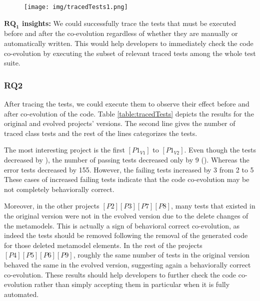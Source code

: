 \begin{figure}[t]
\centering
\texttt{[image: img/tracedTests1.png]}
\caption{}
\label{fig:tracedTests}
\end{figure}

\begin{tcolorbox}[boxsep=-2pt]
\textbf{$\boldsymbol{RQ_1}$ insights:}
We could successfully trace the tests that must be executed before and after the co-evolution regardless of whether they are manually or automatically written. This would help developers to immediately check the code co-evolution by executing the subset of relevant traced tests among the whole test suite. 
\end{tcolorbox}

\subsubsection{RQ2}

After tracing the tests, we could execute them to observe their effect before and after co-evolution of the code. Table \ref{table:tracedTests} depicts the results for the original and evolved projects' versions. The second line gives the number of traced class tests and the rest of the lines categorizes the tests.  

The most interesting project is the first $[P1_{V1}]$ to $[P1_{V2}]$. Even though the tests decreased by ), the number of passing tests decreased only by 9 (). Whereas the error tests decreased by 155. However, the failing tests increased by 3 from 2 to 5 These cases of increased failing tests indicate that the code co-evolution may be not completely behaviorally correct. 

Moreover, in the other projects $[P2][P3][P7][P8]$, many tests that existed in the original version were not in the evolved version due to the delete changes of the metamodels. This is actually a sign of behavioral correct co-evolution, as indeed the tests should be removed following the removal of the generated code for those deleted metamodel elements. 
\red{}In the rest of the projects $[P4][P5][P6][P9]$, roughly the same number of tests in the original version behaved the same in the evolved version, suggesting again a behaviorally correct co-evolution.
These results should help developers to further check the code co-evolution rather than simply accepting them in particular when it is fully automated. 

